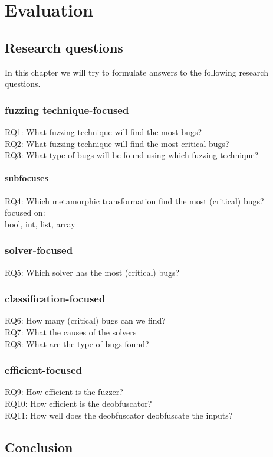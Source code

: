 \chapter{Evaluation}
\label{cha:eval}
\label{cha:intro}


\section{Research questions}
\label{eval:RQ}
In this chapter we will try to formulate answers to the following research questions.
\subsection{fuzzing technique-focused}
RQ1: What fuzzing technique will find the most bugs?\\
RQ2: What fuzzing technique will find the most critical bugs?\\
RQ3: What type of bugs will be found using which fuzzing technique?\\
\subsubsection{subfocuses}
RQ4: Which metamorphic transformation find the most (critical) bugs?\\
focused on: \\
bool, int, list, array
\subsection{solver-focused}
RQ5: Which solver has the most (critical) bugs?\\
\subsection{classification-focused}
RQ6: How many (critical) bugs can we find?\\
RQ7: What the causes of the solvers\\
RQ8: What are the type of bugs found?\\
\subsection{efficient-focused}
RQ9: How efficient is the fuzzer?\\
RQ10: How efficient is the deobfuscator?\\
RQ11: How well does the deobfuscator deobfuscate the inputs?\\



\section{Conclusion}
\label{eval:conclusion}

